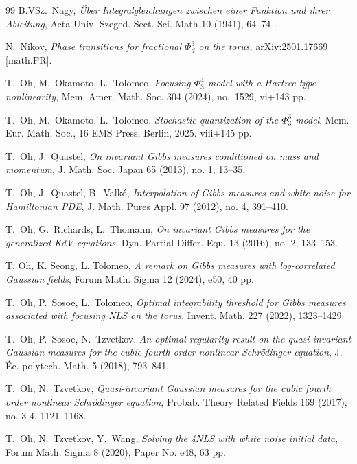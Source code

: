 \documentclass[letterpaper, 11pt,  reqno]{amsart}
\numberwithin{equation}{section}
\numberwithin{theorem}{section}
\begin{document}
\begin{thebibliography}{99}
B.VSz.~Nagy, {\it Über Integralgleichungen zwischen einer Funktion und ihrer Ableitung},
Acta Univ. Szeged. Sect. Sci. Math 10  (1941), 64--74 .


N.~Nikov, 
{\it Phase transitions for fractional $\Phi^3_d$ on the torus}, 
arXiv:2501.17669 [math.PR].

	
T.~Oh, M.~Okamoto,  L.~Tolomeo,
{\it Focusing $\Phi^4_3$-model with a Hartree-type nonlinearity}, Mem. Amer. Math. Soc. 304 (2024), no.~1529, vi+143 pp.
	
T.~Oh, M.~Okamoto, L.~Tolomeo, {\it Stochastic quantization of the $\Phi_3^3$-model}, 
Mem. Eur. Math. Soc., 16 EMS Press, Berlin, 2025. viii+145 pp.
	

T.~Oh, J.~Quastel, 
{\it 
On invariant Gibbs measures conditioned on mass and momentum}, J. Math. Soc. Japan 65 (2013), no. 1, 13--35. 
	
T.~Oh, J.~Quastel, B.~Valk\'o,
{\it  Interpolation of Gibbs measures and white noise for Hamiltonian PDE}, J. Math. Pures Appl. 97 (2012), no. 4, 391--410. 
	
	
T.~Oh, G.~Richards, L.~Thomann,
{\it On invariant Gibbs measures for the generalized KdV equations}, Dyn. Partial Differ. Equ. 13 (2016), no. 2, 133--153. 
	
	
	
T. Oh, K. Seong, L. Tolomeo, 
{\it A remark on Gibbs measures with log-correlated Gaussian fields}, 
Forum Math. Sigma 12 (2024), e50, 40 pp. 
	
T.~Oh, P.~Sosoe, L.~Tolomeo, 
{\it Optimal integrability threshold for Gibbs measures associated with focusing NLS on the torus},
Invent. Math. 227 (2022), 1323--1429.
	
	
T.~Oh, P.~Sosoe, N.~Tzvetkov,
{\it  An optimal regularity result on the quasi-invariant Gaussian measures for the cubic fourth order nonlinear Schr\"odinger equation}, 
J. \'Ec. polytech. Math. 5 (2018), 793--841.
	
T.~Oh, N.~Tzvetkov,
{\it  Quasi-invariant Gaussian measures for the cubic fourth order nonlinear Schr\"odinger equation}, 
Probab. Theory Related Fields 169 (2017), no. 3-4, 1121--1168.
	
T.~Oh, N.~Tzvetkov, Y.~Wang,
{\it Solving the 4NLS with white noise initial data},  
Forum Math. Sigma 8 (2020), Paper No. e48, 63 pp.
	
	
	

\end{thebibliography}
\end{document}
